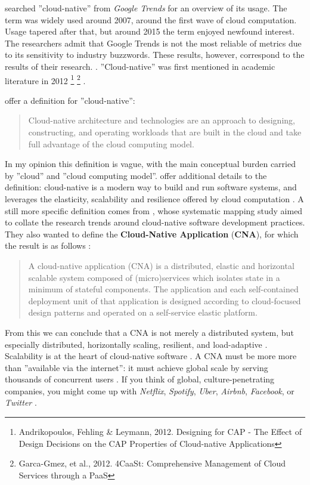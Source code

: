 \documentclass[utf8,english]{gradu3}
\begin{document}
\textcite[8]{Kratzke2017} searched ''cloud-native'' from \textit{Google Trends} for an overview
of its usage. The term was widely used around 2007, around the first wave of
cloud computation. Usage tapered after that, but around 2015 the term enjoyed
newfound interest. The researchers admit that Google Trends is not the most
reliable of metrics due to its sensitivity to industry buzzwords. These results,
however, correspond to the results of their research. \textcite[8]{Kratzke2017}.
''Cloud-native'' was first mentioned in academic literature in 2012
\footnote{Andrikopoulos, Fehling \& Leymann, 2012. Designing for CAP - The Effect
  of Design Decisions on the CAP Properties of Cloud-native Applications}
\footnote{Garca-Gmez, et al., 2012. 4CaaSt: Comprehensive Management of Cloud
  Services through a PaaS} .

\textcite{Microsoft2022} offer a definition for ''cloud-native'':

\begin{quote} Cloud-native architecture and technologies are an approach to
  designing, constructing, and operating workloads that are built in the cloud and
  take full advantage of the cloud computing model.
\end{quote}

In my opinion this definition is vague, with the main conceptual burden carried
by ''cloud'' and ''cloud computing model''. \textcite{Patrizio2018} offer
additional details to the definition: cloud-native is a modern way to build and
run software systems, and leverages the elasticity, scalability and resilience
offered by cloud computation \textcite{Patrizio2018}. A still more specific
definition comes from \textcite{Kratzke2017}, whose systematic mapping study
aimed to collate the research trends around cloud-native software development
practices. They also wanted to define the \textbf{Cloud-Native Application}
(\textbf{CNA}), for which the result is as follows \parencite[13]{Kratzke2017}:

\begin{quote}
  A cloud-native application (CNA) is a distributed, elastic and
  horizontal scalable system composed of (micro)services which isolates state in a
  minimum of stateful components. The application and each self-contained
  deployment unit of that application is designed according to cloud-focused
  design patterns and operated on a self-service elastic platform.
\end{quote}

From this we can conclude that a CNA is not merely a distributed system, but
especially distributed, horizontally scaling, resilient, and load-adaptive
\parencite[13]{Kratzke2017}. Scalability is at the heart of cloud-native
software \parencite{CNAF2018}. A CNA must be more more than ''available via the
internet'': it must achieve global scale by serving thousands of concurrent
users \parencite[17]{Gannon2017}. If you think of global, culture-penetrating
companies, you might come up with \textit{Netflix}, \textit{Spotify},
\textit{Uber}, \textit{Airbnb}, \textit{Facebook}, or \textit{Twitter}
\parencites{Gannon2017}{Patrizio2018}.
\end{document}
